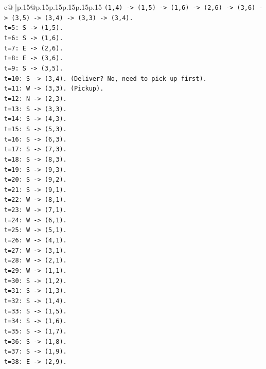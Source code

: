 \documentclass{article}
\begin{document}
{\begin{supertabular}{c@{$\;$}|p{.15\linewidth}@{}p{.15\linewidth}p{.15\linewidth}p{.15\linewidth}p{.15\linewidth}p{.15\linewidth}}
{{{\texttt{(1,4) {-}> (1,5) {-}> (1,6) {-}> (2,6) {-}> (3,6) {-}> (3,5) {-}> (3,4) {-}> (3,3) {-}> (3,4).} \\
\texttt{t=5: S {-}> (1,5).} \\
\texttt{t=6: S {-}> (1,6).} \\
\texttt{t=7: E {-}> (2,6).} \\
\texttt{t=8: E {-}> (3,6).} \\
\texttt{t=9: S {-}> (3,5).} \\
\texttt{t=10: S {-}> (3,4). (Deliver? No, need to pick up first).} \\
\texttt{t=11: W {-}> (3,3). (Pickup).} \\
\texttt{t=12: N {-}> (2,3).} \\
\texttt{t=13: S {-}> (3,3).} \\
\texttt{t=14: S {-}> (4,3).} \\
\texttt{t=15: S {-}> (5,3).} \\
\texttt{t=16: S {-}> (6,3).} \\
\texttt{t=17: S {-}> (7,3).} \\
\texttt{t=18: S {-}> (8,3).} \\
\texttt{t=19: S {-}> (9,3).} \\
\texttt{t=20: S {-}> (9,2).} \\
\texttt{t=21: S {-}> (9,1).} \\
\texttt{t=22: W {-}> (8,1).} \\
\texttt{t=23: W {-}> (7,1).} \\
\texttt{t=24: W {-}> (6,1).} \\
\texttt{t=25: W {-}> (5,1).} \\
\texttt{t=26: W {-}> (4,1).} \\
\texttt{t=27: W {-}> (3,1).} \\
\texttt{t=28: W {-}> (2,1).} \\
\texttt{t=29: W {-}> (1,1).} \\
\texttt{t=30: S {-}> (1,2).} \\
\texttt{t=31: S {-}> (1,3).} \\
\texttt{t=32: S {-}> (1,4).} \\
\texttt{t=33: S {-}> (1,5).} \\
\texttt{t=34: S {-}> (1,6).} \\
\texttt{t=35: S {-}> (1,7).} \\
\texttt{t=36: S {-}> (1,8).} \\
\texttt{t=37: S {-}> (1,9).} \\
\texttt{t=38: E {-}> (2,9).} \\
}}}
\end{supertabular}}
\end{document}
